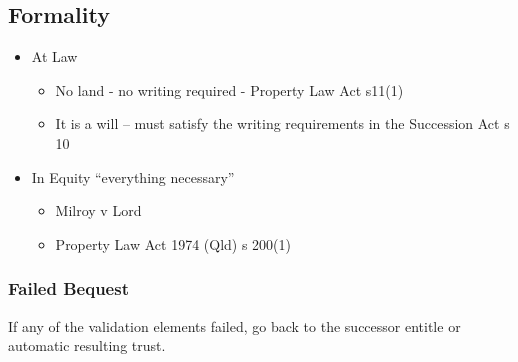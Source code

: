 \subsection*{Formality}
\begin{itemize}
    \item At Law
        \begin{itemize}
            \item  No land - no writing required - Property Law Act s11(1)
            \item It is a will – must satisfy the writing requirements in the
Succession Act s 10
        \end{itemize}
    \item In Equity “everything necessary”
        \begin{itemize}
            \item Milroy v Lord
            \item Property Law Act 1974 (Qld) s 200(1)
        \end{itemize}
\end{itemize}

\subsubsection*{Failed Bequest}
If any of the validation elements failed, go back to the successor entitle or automatic resulting trust. 

